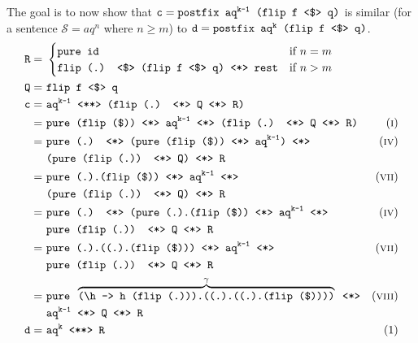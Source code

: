 The goal is to now show that $\texttt{c} = \texttt{postfix aq}^\texttt{k-1}\texttt{ (flip f \fmap q)}$ is similar (for a sentence $\mathcal{S} = aq^n$ where $n \geq m$) to $\texttt{d} = \texttt{postfix aq}^\texttt{k}\texttt{ (flip f \fmap q)}$.
\begin{align*}
    \texttt{R} =\ & \begin{cases}
        \texttt{pure id} & \text{if } n = m \\
        \texttt{flip (.) \fmap (flip f \fmap q) \ap rest} & \text{if } n > m
    \end{cases} \\
    \texttt{Q} =\ & \texttt{flip f \fmap q} \\
    \texttt{c} =\ & \texttt{aq}^\texttt{k-1}\texttt{ \pa (flip (.) \ap Q \ap R)} \\
    =\ & \texttt{pure (flip (\$)) \ap aq}^\texttt{k-1}\texttt{ \ap (flip (.) \ap Q \ap R)} & \equi[1] \\
    =\ & \texttt{pure (.) \ap (pure (flip (\$)) \ap aq}^\texttt{k-1}\texttt{) \ap} & \equi[4] \\
    & \texttt{(pure (flip (.)) \ap Q) \ap R} \\
    =\ & \texttt{pure (.).(flip (\$)) \ap aq}^\texttt{k-1}\texttt{ \ap} & \equi[7] \\
    & \texttt{(pure (flip (.)) \ap Q) \ap R} \\
    =\ & \texttt{pure (.) \ap (pure (.).(flip (\$)) \ap aq}^\texttt{k-1}\texttt{ \ap} & \equi[4] \\
    & \texttt{pure (flip (.)) \ap Q \ap R} \\
    =\ & \texttt{pure (.).((.).(flip (\$))) \ap aq}^\texttt{k-1}\texttt{ \ap} & \equi[7] \\
    & \texttt{pure (flip (.)) \ap Q \ap R} \\
    =\ & \texttt{pure }\overbrace{\texttt{(\textbackslash h -> h (flip (.))).((.).((.).(flip (\$))))}}^{\gamma}\texttt{ \ap} & \equi[8] \\
    & \texttt{aq}^\texttt{k-1}\texttt{ \ap Q \ap R} \\
    \texttt{d} =\ & \texttt{aq}^\texttt{k}\texttt{ \pa R} & \text{(1)} \\

\end{align*}
